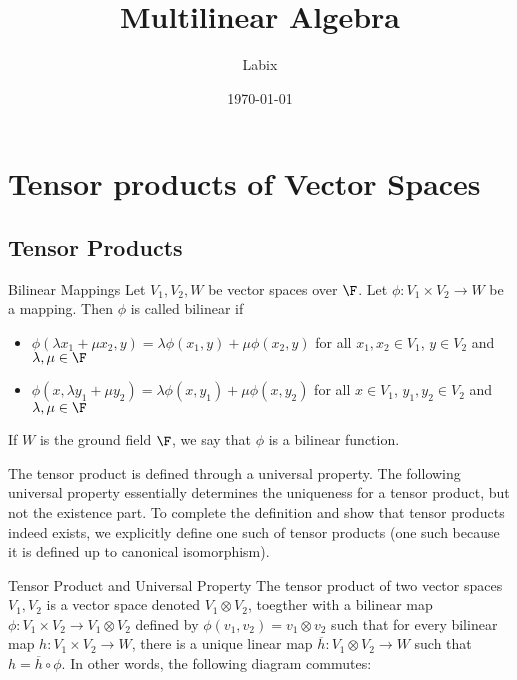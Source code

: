 \documentclass[a4paper]{article}
\title{Multilinear Algebra}
\author{Labix}
\date{\today}
\begin{document}
\maketitle
\begin{abstract}
\end{abstract}
\pagebreak
\tableofcontents
\pagebreak

\section{Tensor products of Vector Spaces}
\subsection{Tensor Products}
\begin{defn}{Bilinear Mappings}{} Let $V_1,V_2,W$ be vector spaces over $\F$. Let $\phi:V_1\times V_2\to W$ be a mapping. Then $\phi$ is called bilinear if
\begin{itemize}
\item $\phi(\lambda x_1+\mu x_2,y)=\lambda\phi(x_1,y)+\mu\phi(x_2,y)$ for all $x_1,x_2\in V_1$, $y\in V_2$ and $\lambda,\mu\in\F$
\item $\phi(x,\lambda y_1+\mu y_2)=\lambda\phi(x,y_1)+\mu\phi(x,y_2)$ for all $x\in V_1$, $y_1,y_2\in V_2$ and $\lambda,\mu\in\F$
\end{itemize}
If $W$ is the ground field $\F$, we say that $\phi$ is a bilinear function. 
\end{defn}

The tensor product is defined through a universal property. The following universal property essentially determines the uniqueness for a tensor product, but not the existence part. To complete the definition and show that tensor products indeed exists, we explicitly define one such of tensor products (one such because it is defined up to canonical isomorphism). 

\begin{defn}{Tensor Product and Universal Property}{} The tensor product of two vector spaces $V_1,V_2$ is a vector space denoted $V_1\otimes V_2$, toegther with a bilinear map $\phi:V_1\times V_2\to V_1\otimes V_2$ defined by $\phi(v_1,v_2)=v_1\otimes v_2$ such that for every bilinear map $h:V_1\times V_2\to W$, there is a unique linear map $\overline{h}:V_1\otimes V_2\to W$ such that $h=\overline{h}\circ\phi$. In other words, the following diagram commutes: \\~\\
\end{defn}
\end{document}
